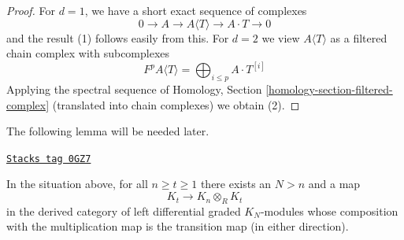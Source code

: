 \begin{proof}
For $d = 1$, we have a short exact sequence of complexes
$$
0 \to A \to A\langle T \rangle \to A \cdot T \to 0
$$
and the result (1) follows easily from this. For $d = 2$ we view
$A\langle T \rangle$ as a filtered chain complex with subcomplexes
$$
F^pA\langle T \rangle = \bigoplus\nolimits_{i \leq p} A \cdot T^{[i]}
$$
Applying the spectral sequence of
Homology, Section \ref{homology-section-filtered-complex}
(translated into chain complexes) we obtain (2).
\end{proof}

The following lemma will be needed later.

\begin{lemma}
\label{dpa-lemma-construct-some-maps}
\href{https://stacks.math.columbia.edu/tag/0GZ7}{\texttt{Stacks tag 0GZ7}}

In the situation above, for all $n \geq t \geq 1$ there exists an $N > n$
and a map
$$
K_t \longrightarrow K_n \otimes_R K_t
$$
in the derived category of left differential graded $K_N$-modules
whose composition with the multiplication map is the transition map
(in either direction).
\end{lemma}

